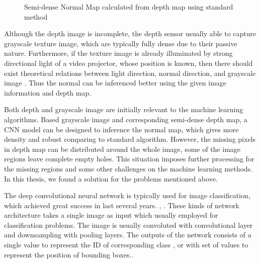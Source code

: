 \begin{figure}[!h]
	\centering
	\caption{Semi-dense Normal Map calculated from depth map using standard method}
	\label{fig:standard_normal_inference}
\end{figure}

Although the depth image is incomplete, the depth sensor usually able to capture grayscale texture image, which are typically fully dense due to their passive nature. Furthermore, if the texture image is already illuminated by strong directional light of a video projector, whose position is known, then there should exist theoretical relations between light direction, normal direction, and grayscale image . Thus the normal can be inferenced better using the given image information and depth map. 

Both depth and grayscale image are initially relevant to the machine learning algorithms. Based grayscale image and corresponding semi-dense depth map, a CNN model can be designed to inference the normal map, which gives more density and robust comparing to standard algorithm. However, the missing pixels in depth map can be distributed around the whole image, some of the image regions leave complete empty holes. This situation imposes further processing for the missing regions and some other challenges on the machine learning methods. 
In this thesis, we found a solution for the problems mentioned above.

The deep convolutional neural network is typically used for image classification, which achieved great success in last several years. \cite{yolov3}, \cite{efficientDet}. 
These kinds of network architecture takes a single image as input which usually employed for classification problems. The image is usually convoluted with convolutional layer and downsampling with pooling layers. The outputs of the network consists of a single value to represent the ID of corresponding class \cite{efficientDet}, or with set of values to represent the position of bounding boxes.\cite{yolov3}.


